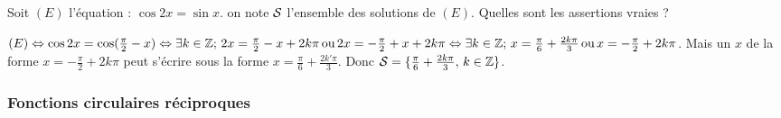 \begin{question} 

Soit $(E)$ l'équation : $ \cos 2x = \sin x $. on note $\cal{S}$ l'ensemble des solutions de $(E)$. Quelles sont les assertions vraies ?

\begin{answers}



\end{answers}
\begin{explanations}
$(E) \Leftrightarrow  \cos 2x =  \cos ( \frac{\pi}{2} -x) \Leftrightarrow      \exists k\in \mathbb{Z}; \,  2x =  \frac{\pi}{2} -x +2k\pi \, \mbox {ou} \, 2x =  -\frac{\pi}{2} +x +2k\pi  \Leftrightarrow      \exists k\in \mathbb{Z};\,  x =  \frac{\pi}{6}  +\frac{ 2k\pi}{3} \, \mbox {ou} \, x =  -\frac{\pi}{2} +2k\pi$. 
Mais un $x$ de la forme $x =  -\frac{\pi}{2} +2k\pi$ peut s'écrire sous la forme
$x = \frac{\pi}{6}  +\frac{ 2k'\pi}{3}$. 
Donc ${\cal{S}} = \{\frac{\pi}{6}  +\frac{ 2k\pi}{3}, \, k\in \mathbb{Z} \}$.

\end{explanations}


\end{question}


\subsubsection{Fonctions circulaires réciproques}

